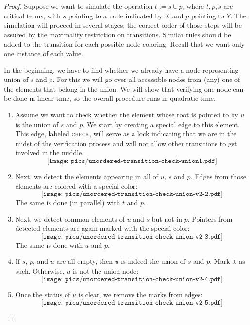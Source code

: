\documentclass[submission,copyright,creativecommons,english]{eptcs}
\begin{document}
\begin{proof}
Suppose we want to simulate the operation $t:=s\cup p$, where $t,p,s$ are critical terms, with $s$ pointing to a node indicated by $X$
and $p$ pointing to $Y$. 
The simulation will proceed in several stages; the correct order of those steps will be assured by the maximality restriction on transitions.
Similar rules should be added to the transition for each possible node coloring.
Recall that we want only one instance of each value.

In the beginning, we have to find whether we already have a node representing union of $s$ and $p$.
For this we will go over all accessible nodes from (any) one of the elements that belong in the union. We will show that verifying one node can be done in linear time, so the overall procedure runs in quadratic time.
\begin{enumerate}
\item Assume we want to check whether the element whose  root is pointed to by $u$ is the union of $s$ and $p$. We start by creating a special edge to this element. This edge, labeled \textsc{check}, will serve as a lock indicating that we are in the midst of the verification process and will not allow  other transitions to get involved in the middle.
\[\texttt{[image: pics/unordered-transition-check-union1.pdf]}\]

\item Next, we detect the elements appearing in all of $u$, $s$ and $p$. Edges from those elements  are colored with a special color:
\[\texttt{[image: pics/unordered-transition-check-union-v2-2.pdf]}\]
The same is done (in parallel) with $t$ and $p$.

\item Next, we detect common elements of $u$ and $s$ but not in $p$. 
Pointers from detected elements are again marked with the special color:
\[\texttt{[image: pics/unordered-transition-check-union-v2-3.pdf]}\]
The same is done with $u$ and $p$.

\item If $s$, $p$, and $u$ are all empty, then $u$ is indeed the union of $s$ and $p$. Mark it as such. Otherwise, $u$ is not the union node:
\[\texttt{[image: pics/unordered-transition-check-union-v2-4.pdf]}\]

\item Once the status of $u$ is clear, we remove the marks from edges:
\[\texttt{[image: pics/unordered-transition-check-union-v2-5.pdf]}\]


\end{enumerate}
\end{proof}
\end{document}
